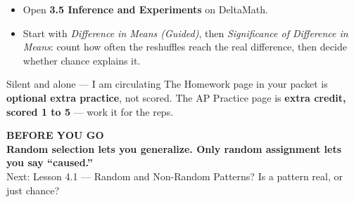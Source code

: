 \documentclass[aspectratio=169, 11pt]{beamer}
\begin{document}
\begin{frame}[t, plain]
  \begin{itemize}\setlength{\itemsep}{5pt}
    \item Open \textbf{3.5 Inference and Experiments} on DeltaMath.
    \item Start with \emph{Difference in Means (Guided)}, then \emph{Significance of Difference
          in Means}: count how often the reshuffles reach the real difference, then decide
          whether chance explains it.
  \end{itemize}
  \begin{block}{Silent and alone --- I am circulating}
    The Homework page in your packet is \textbf{optional extra practice}, not scored. The AP
    Practice page is \textbf{extra credit, scored 1 to 5} --- work it for the reps.
  \end{block}
\end{frame}

{
\begin{frame}[plain]
  \vspace{1.5cm}\hspace{0.8cm}%
  \begin{minipage}{0.86\textwidth}
    {\color{goldacc}\bfseries\small BEFORE YOU GO}\\[0.7cm]
    {\color{white}\bfseries\Large Random selection lets you generalize. Only random assignment
    lets you say ``caused.''}\\[0.9cm]
    {\color{skymid}\small Next: Lesson 4.1 --- Random and Non-Random Patterns? Is a pattern
    real, or just chance?}
  \end{minipage}
\end{frame}
}
\end{document}

